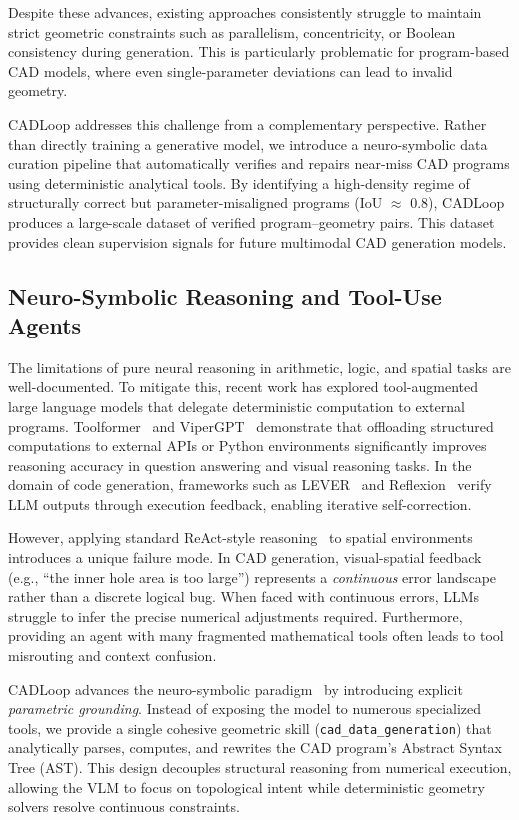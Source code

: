 Despite these advances, existing approaches consistently struggle to
maintain strict geometric constraints such as parallelism,
concentricity, or Boolean consistency during generation.
This is particularly problematic for program-based CAD models,
where even single-parameter deviations can lead to invalid geometry.

CADLoop addresses this challenge from a complementary perspective.
Rather than directly training a generative model, we introduce a
neuro-symbolic data curation pipeline that automatically verifies and
repairs near-miss CAD programs using deterministic analytical tools.
By identifying a high-density regime of structurally correct but
parameter-misaligned programs (IoU $\approx$ 0.8), CADLoop produces a
large-scale dataset of verified program–geometry pairs. This dataset
provides clean supervision signals for future multimodal CAD
generation models.

\subsection{Neuro-Symbolic Reasoning and Tool-Use Agents}

The limitations of pure neural reasoning in arithmetic, logic, and
spatial tasks are well-documented. To mitigate this, recent work has
explored tool-augmented large language models that delegate
deterministic computation to external programs.
Toolformer~\cite{schick2023toolformer} and
ViperGPT~\cite{suris2023vipergpt} demonstrate that offloading
structured computations to external APIs or Python environments
significantly improves reasoning accuracy in question answering and
visual reasoning tasks.
In the domain of code generation, frameworks such as
LEVER~\cite{ni2023lever} and Reflexion~\cite{shinn2023reflexion}
verify LLM outputs through execution feedback, enabling iterative
self-correction.

However, applying standard ReAct-style reasoning~\cite{yao2023react}
to spatial environments introduces a unique failure mode.
In CAD generation, visual-spatial feedback (e.g.,
``the inner hole area is too large'') represents a \emph{continuous}
error landscape rather than a discrete logical bug.
When faced with continuous errors, LLMs struggle to infer the precise
numerical adjustments required.
Furthermore, providing an agent with many fragmented mathematical
tools often leads to tool misrouting and context confusion.

CADLoop advances the neuro-symbolic paradigm~\cite{ellis2021dreamcoder}
by introducing explicit \emph{parametric grounding}.
Instead of exposing the model to numerous specialized tools,
we provide a single cohesive geometric skill
(\texttt{cad\_data\_generation}) that analytically parses,
computes, and rewrites the CAD program's Abstract Syntax Tree (AST).
This design decouples structural reasoning from numerical execution,
allowing the VLM to focus on topological intent while deterministic
geometry solvers resolve continuous constraints.